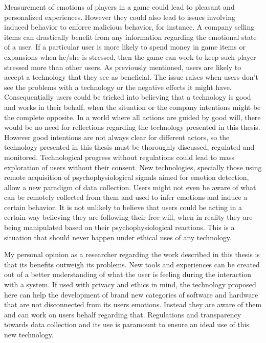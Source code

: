 Measurement of emotions of players in a game could lead to pleasant and personalized experiences. However they could also lead to issues involving induced behavior to enforce malicious behavior, for instance. A company selling items can drastically benefit from any information regarding the emotional state of a user. If a particular user is more likely to spend money in game items or expansions when he/she is stressed, then the game can work to keep such player stressed more than other users. As previously mentioned, users are likely to accept a technology that they see as beneficial. The issue raises when users don't see the problems with a technology or the negative effects it might have. Consequentially users could be tricked into believing that a technology is good and works in their behalf, when the situation or the company intentions might be the complete opposite. In a world where all actions are guided by good will, there would be no need for reflections regarding the technology presented in this thesis. However good intentions are not always clear for different actors, so the technology presented in this thesis must be thoroughly discussed, regulated and monitored. Technological progress without regulations could lead to mass exploration of users without their consent. New technologies, specially those using remote acquisition of psychophysiological signals aimed for emotion detection, allow a new paradigm of data collection. Users might not even be aware of what can be remotely collected from them and used to infer emotions and induce a certain behavior. It is not unlikely to believe that users could be acting in a certain way believing they are following their free will, when in reality they are being manipulated based on their psychophysiological reactions. This is a situation that should never happen under ethical uses of any technology.

My personal opinion as a researcher regarding the work described in this thesis is that its benefits outweigh its problems. New tools and experiences can be created out of a better understanding of what the user is feeling during the interaction with a system. If used with privacy and ethics in mind, the technology proposed here can help the development of brand new categories of software and hardware that are not disconnected from its users emotions. Instead they are aware of them and can work on users behalf regarding that. Regulations and transparency towards data collection and its use is paramount to ensure an ideal use of this new technology.
